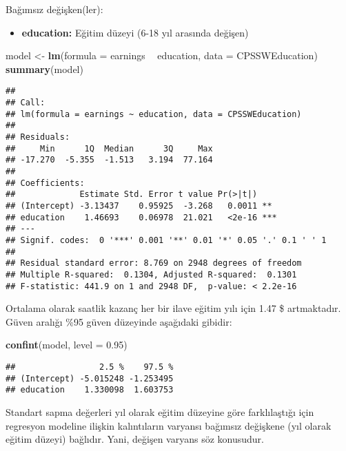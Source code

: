\documentclass[
]{book}
\newenvironment{Shaded}{\begin{snugshade}}{\end{snugshade}}
\newcommand{\DataTypeTok}[1]{\textcolor[rgb]{0.13,0.29,0.53}{#1}}
\newcommand{\FloatTok}[1]{\textcolor[rgb]{0.00,0.00,0.81}{#1}}
\newcommand{\KeywordTok}[1]{\textcolor[rgb]{0.13,0.29,0.53}{\textbf{#1}}}
\newcommand{\NormalTok}[1]{#1}
\newcommand{\OperatorTok}[1]{\textcolor[rgb]{0.81,0.36,0.00}{\textbf{#1}}}
\newcommand{\StringTok}[1]{\textcolor[rgb]{0.31,0.60,0.02}{#1}}
\providecommand{\tightlist}{%
  \setlength{\itemsep}{0pt}\setlength{\parskip}{0pt}}
\begin{document}
Bağımsız değişken(ler):

\begin{itemize}
\tightlist
\item
  \textbf{education:} Eğitim düzeyi (6-18 yıl arasında değişen)
\end{itemize}

\begin{Shaded}
\begin{Highlighting}[]
\NormalTok{model <-}\StringTok{ }\KeywordTok{lm}\NormalTok{(}\DataTypeTok{formula =}\NormalTok{ earnings }\OperatorTok{~}\StringTok{ }\NormalTok{education, }\DataTypeTok{data =}\NormalTok{ CPSSWEducation)}
\KeywordTok{summary}\NormalTok{(model)}
\end{Highlighting}
\end{Shaded}

\begin{verbatim}
## 
## Call:
## lm(formula = earnings ~ education, data = CPSSWEducation)
## 
## Residuals:
##     Min      1Q  Median      3Q     Max 
## -17.270  -5.355  -1.513   3.194  77.164 
## 
## Coefficients:
##             Estimate Std. Error t value Pr(>|t|)    
## (Intercept) -3.13437    0.95925  -3.268   0.0011 ** 
## education    1.46693    0.06978  21.021   <2e-16 ***
## ---
## Signif. codes:  0 '***' 0.001 '**' 0.01 '*' 0.05 '.' 0.1 ' ' 1
## 
## Residual standard error: 8.769 on 2948 degrees of freedom
## Multiple R-squared:  0.1304, Adjusted R-squared:  0.1301 
## F-statistic: 441.9 on 1 and 2948 DF,  p-value: < 2.2e-16
\end{verbatim}

Ortalama olarak saatlik kazanç her bir ilave eğitim yılı için 1.47 \$ artmaktadır. Güven aralığı \%95 güven düzeyinde aşağıdaki gibidir:

\begin{Shaded}
\begin{Highlighting}[]
\KeywordTok{confint}\NormalTok{(model, }\DataTypeTok{level =} \FloatTok{0.95}\NormalTok{)}
\end{Highlighting}
\end{Shaded}

\begin{verbatim}
##                 2.5 %    97.5 %
## (Intercept) -5.015248 -1.253495
## education    1.330098  1.603753
\end{verbatim}

Standart sapma değerleri yıl olarak eğitim düzeyine göre farklılaştığı için regresyon modeline ilişkin kalıntıların varyansı bağımsız değişkene (yıl olarak eğitim düzeyi) bağlıdır. Yani, değişen varyans söz konusudur.
\end{document}
